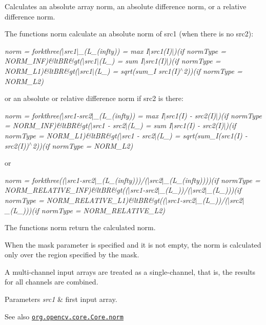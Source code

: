 Calculates an absolute array norm, an absolute difference norm, or a relative difference norm.

The functions {\ttfamily norm} calculate an absolute norm of {\ttfamily src1} (when there is no {\ttfamily src2})\+:

{\itshape norm = forkthree($\vert$src1$\vert$\+\_\+(L\+\_\+(infty)) = max {\itshape I$\vert$src1(I)$\vert$)(if norm\+Type = N\+O\+R\+M\+\_\+\+I\+NF)\&lt\+BR\&gt($\vert$src1$\vert$}(L\+\_) = sum {\itshape I$\vert$src1(I)$\vert$)(if norm\+Type = N\+O\+R\+M\+\_\+\+L1)\&lt\+BR\&gt($\vert$src1$\vert$}(L\+\_) = sqrt(sum\+\_\+\+I src1(\+I)$^\wedge$2))(if norm\+Type = N\+O\+R\+M\+\_\+\+L2)}

or an absolute or relative difference norm if {\ttfamily src2} is there\+:

{\itshape norm = forkthree($\vert$src1-\/src2$\vert$\+\_\+(L\+\_\+(infty)) = max {\itshape I$\vert$src1(I) -\/ src2(\+I)$\vert$)(if norm\+Type = N\+O\+R\+M\+\_\+\+I\+NF)\&lt\+BR\&gt($\vert$src1 -\/ src2$\vert$}(L\+\_) = sum {\itshape I$\vert$src1(I) -\/ src2(\+I)$\vert$)(if norm\+Type = N\+O\+R\+M\+\_\+\+L1)\&lt\+BR\&gt($\vert$src1 -\/ src2$\vert$}(L\+\_) = sqrt(sum\+\_\+I(src1(\+I) -\/ src2(\+I))$^\wedge$2))(if norm\+Type = N\+O\+R\+M\+\_\+\+L2)}

or

{\itshape norm = forkthree(($\vert$src1-\/src2$\vert$\+\_\+(L\+\_\+(infty)))/($\vert$src2$\vert$\+\_\+(L\+\_\+(infty))))(if norm\+Type = N\+O\+R\+M\+\_\+\+R\+E\+L\+A\+T\+I\+V\+E\+\_\+\+I\+NF)\&lt\+BR\&gt(($\vert$src1-\/src2$\vert$\+\_\+(L\+\_))/($\vert$src2$\vert$\+\_\+(L\+\_)))(if norm\+Type = N\+O\+R\+M\+\_\+\+R\+E\+L\+A\+T\+I\+V\+E\+\_\+\+L1)\&lt\+BR\&gt(($\vert$src1-\/src2$\vert$\+\_\+(L\+\_))/($\vert$src2$\vert$\+\_\+(L\+\_)))(if norm\+Type = N\+O\+R\+M\+\_\+\+R\+E\+L\+A\+T\+I\+V\+E\+\_\+\+L2)}

The functions {\ttfamily norm} return the calculated norm.

When the {\ttfamily mask} parameter is specified and it is not empty, the norm is calculated only over the region specified by the mask.

A multi-\/channel input arrays are treated as a single-\/channel, that is, the results for all channels are combined.


\begin{DoxyParams}{Parameters}
{\em src1} & first input array.\\
\hline
\end{DoxyParams}
\begin{DoxySeeAlso}{See also}
\href{http://docs.opencv.org/modules/core/doc/operations_on_arrays.html#norm}{\tt org.\+opencv.\+core.\+Core.\+norm} 
\end{DoxySeeAlso}
\mbox{\label{classorg_1_1opencv_1_1core_1_1_core_a23c3e3b3fa55f87f23805428dde2a157}} 
